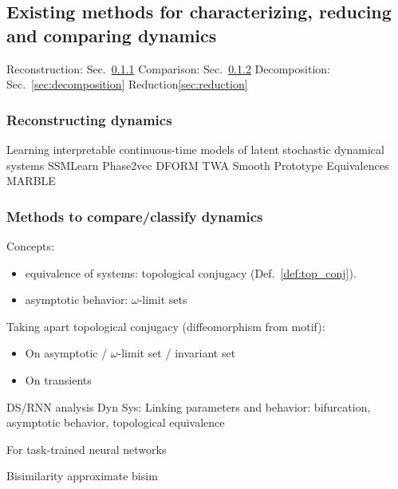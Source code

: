\documentclass{article}
\theoremstyle{definition} \newtheorem{definition}{Definition}  \newtheorem{example}{Example}
\theoremstyle{remark} \newtheorem{remark}{Remark}
\newcounter{ct}
\begin{document}
\subsection{Existing methods for characterizing, reducing and comparing dynamics}\label{sec:sota_methods}

Reconstruction: Sec.~\ref{sec:reconstruction}
Comparison: Sec.~\ref{sec:comparison}
Decomposition: Sec.~\ref{sec:decomposition}
Reduction\ref{sec:reduction}


\subsubsection{Reconstructing dynamics}\label{sec:reconstruction}
Learning interpretable continuous-time models of latent stochastic dynamical systems \citep{duncker2019learning}
%
SSMLearn \citep{cenedese2022data}
%
Phase2vec \citep{ricci2022phase2vec}
DFORM \citep{chen2024dform}
TWA \citep{moriel2024timewarpattend}
Smooth Prototype Equivalences \citep{friedman2025characterizing}
%
MARBLE \citep{gosztolai2025marble}


\subsubsection{Methods to compare/classify dynamics}\label{sec:comparison}
Concepts:
\begin{itemize}
\item equivalence of systems: topological conjugacy (Def.~\ref{def:top_conj}).%
\item asymptotic behavior: $\omega$-limit sets
\end{itemize}

Taking apart topological conjugacy (diffeomorphism from motif):
\begin{itemize}
\item On asymptotic / $\omega$-limit set / invariant set
\item On transients \citep{koch2024biological}
\end{itemize}


DS/RNN analysis
Dyn Sys: Linking parameters and behavior: bifurcation, asymptotic behavior, topological equivalence \citep{beer1995ctrnn, beer2006parameterspace}

For task-trained neural networks
\citep{huang2024measuring}

Bisimilarity\citep{vanderschaft2004bisimulation, vanderschaft2004equivalence, pola2004bisimulation, pola2006equivalence, tabuada2004bisimilar}
approximate bisim\citep{girard2011approximate}
\end{document}

